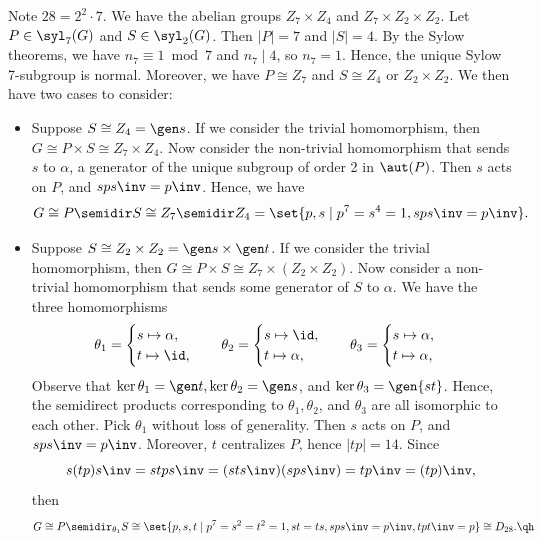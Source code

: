 \begin{sol}
    Note $28 = 2^2 \cdot 7$. We have the abelian groups $Z_7 \times Z_4$ and $Z_7 \times Z_2 \times Z_2$. Let $P \in \syl_7(G)$ and $S \in \syl_2(G)$. Then $|P| = 7$ and $|S| = 4$. By the Sylow theorems, we have $n_7 \equiv 1 \bmod 7$ and $n_7 \mid 4$, so $n_7 = 1$. Hence, the unique Sylow 7-subgroup is normal. Moreover, we have $P \cong Z_7$ and $S \cong Z_4$ or $Z_2 \times Z_2$. We then have two cases to consider:
    \begin{itemize}
        \item Suppose $S \cong Z_4 = \gen s$. If we consider the trivial homomorphism, then $G \cong P \times S \cong Z_7 \times Z_4$. Now consider the non-trivial homomorphism that sends $s$ to $\alpha$, a generator of the unique subgroup of order 2 in $\aut(P)$. Then $s$ acts on $P$, and $sps\inv = p\inv$. Hence, we have
        \[G \cong P \semidir S \cong Z_7 \semidir Z_4 = \set{p, s \mid p^7 = s^4 = 1, sps\inv = p\inv}.\]
        \item Suppose $S \cong Z_2 \times Z_2 = \gen s \times \gen t$. If we consider the trivial homomorphism, then $G \cong P \times S \cong Z_7 \times (Z_2 \times Z_2)$. Now consider a non-trivial homomorphism that sends some generator of $S$ to $\alpha$. We have the three homomorphisms
        \[\theta_1 = 
        \begin{cases}
            s \mapsto \alpha, \\
            t \mapsto \id,
        \end{cases} \quad
        \theta_2 = 
        \begin{cases}
            s \mapsto \id, \\
            t \mapsto \alpha,
        \end{cases} \quad
        \theta_3 = 
        \begin{cases}
            s \mapsto \alpha, \\
            t \mapsto \alpha,
        \end{cases}\]
        Observe that $\ker\theta_1 = \gen t, \ker\theta_2 = \gen s$, and $\ker\theta_3 = \gen{st}$. Hence, the semidirect products corresponding to $\theta_1, \theta_2$, and $\theta_3$ are all isomorphic to each other. Pick $\theta_1$ without loss of generality. Then $s$ acts on $P$, and $sps\inv = p\inv$. Moreover, $t$ centralizes $P$, hence $|tp| = 14$. Since
        \[s(tp)s\inv = stps\inv = (sts\inv)(sps\inv) = tp\inv = (tp)\inv,\]
        then
        \[G \cong P \semidir_{\theta_1} S \cong \set{p, s, t \mid p^7 = s^2 = t^2 = 1, st = ts, sps\inv = p\inv, tpt\inv = p} \cong D_{28}. \qh\] 
    \end{itemize}
\end{sol}

